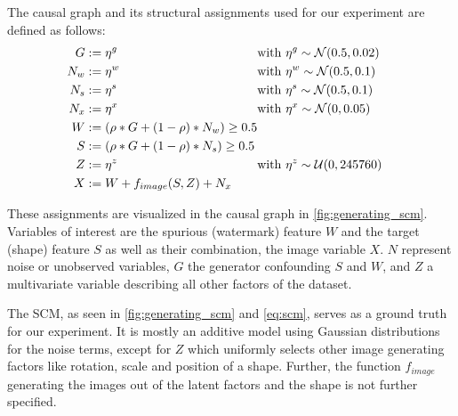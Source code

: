 The causal graph and its structural assignments used for our experiment are defined as follows: 
\begin{equation}
\label{eq:scm}
\begin{aligned}[c]
G&:=\eta^g \notag \\ 
N_w&:=\eta^w  \notag \\ 
N_s&:=\eta^s \notag \\ 
N_x&:=\eta^x  \notag \\ 
W&:=(\rho * G + (1-\rho)* N_w) \geq 0.5 \notag \\ 
S&:=(\rho * G + (1-\rho)* N_s) \geq 0.5 \notag \\ 
Z&:= \eta^z \\ 
X&:= W + f_{image}(S, Z) + N_{x} \\
\end{aligned}
\begin{aligned}[c]
& \mathrm{with} \  \eta^g \sim \mathcal{N}(0.5,0.02) && \notag \\ 
& \mathrm{with} \  \eta^w \sim \mathcal{N}(0.5,0.1) && \notag \\ 
& \mathrm{with} \  \eta^s \sim \mathcal{N}(0.5,0.1) && \notag \\ 
& \mathrm{with} \  \eta^x \sim \mathcal{N}(0,0.05) && \notag \\ 
\\
\\
& \mathrm{with} \  \eta^z \sim \mathcal{U}(0,245760) && \notag \\ 
\\
\end{aligned}
\end{equation}

These assignments are visualized in the causal graph in \cref{fig:generating_scm}.
Variables of interest are the spurious (watermark) feature $W$ and the target (shape) feature $S$ as well as their combination, the image variable $X$. $N$ represent noise or unobserved variables, $G$ the generator confounding $S$ and $W$, and $Z$ a multivariate variable describing all other factors of the dataset. 

The SCM, as seen in \cref{fig:generating_scm} and \cref{eq:scm}, serves as a ground truth for our experiment. It is mostly an additive model using Gaussian distributions for the noise terms, except for $Z$ which uniformly selects other image generating factors like rotation, scale and position of a shape. Further, the function $f_{image}$ generating the images out of the latent factors and the shape is not further specified.

